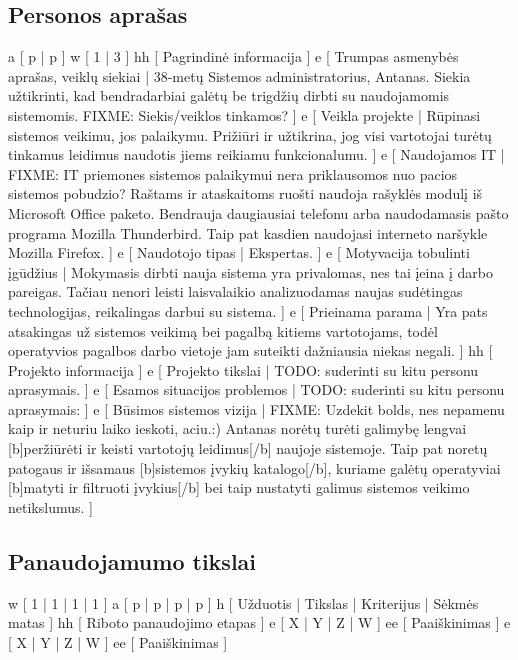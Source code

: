 \subsection{Personos aprašas}
\xtableu
{
  a [ p | p ]
  w [ 1 | 3 ]
  hh [ Pagrindinė informacija ]
  e [ Trumpas asmenybės aprašas, veiklų siekiai
  |
    38-metų Sistemos administratorius, Antanas. Siekia užtikrinti, kad bendradarbiai
    galėtų be trigdžių dirbti su naudojamomis sistemomis.
    FIXME: Siekis/veiklos tinkamos?
  ]
  e [ Veikla projekte
  |
    Rūpinasi sistemos veikimu, jos palaikymu. Prižiūri ir užtikrina, jog visi vartotojai turėtų tinkamus leidimus
    naudotis jiems reikiamu funkcionalumu.
  ]
  e [ Naudojamos IT
  |
    FIXME: IT priemones sistemos palaikymui nera priklausomos nuo pacios sistemos pobudzio?
    Raštams ir ataskaitoms ruošti naudoja rašyklės modulį iš Microsoft Office paketo.
    Bendrauja daugiausiai telefonu arba naudodamasis pašto
    programa Mozilla Thunderbird. Taip pat kasdien naudojasi interneto naršykle Mozilla Firefox.
  ]
  e [ Naudotojo tipas
  |
    Ekspertas.
  ]
  e [ Motyvacija tobulinti įgūdžius
  |
    Mokymasis dirbti nauja sistema yra privalomas, nes tai įeina į darbo pareigas. Tačiau nenori
    leisti laisvalaikio analizuodamas naujas sudėtingas technologijas, reikalingas darbui su sistema.
  ]
  e [ Prieinama parama
  |
    Yra pats atsakingas už sistemos veikimą bei pagalbą kitiems vartotojams, todėl operatyvios pagalbos
    darbo vietoje jam suteikti dažniausia niekas negali.
  ]
  hh [ Projekto informacija ]
  e [ Projekto tikslai
  |
    TODO: suderinti su kitu personu aprasymais.
  ]
  e [ Esamos situacijos problemos
  |
    TODO: suderinti su kitu personu aprasymais:
  ]
  e [ Būsimos sistemos vizija
  |
    FIXME: Uzdekit bolds, nes nepamenu kaip ir neturiu laiko ieskoti, aciu.:)
    Antanas norėtų turėti galimybę lengvai [b]peržiūrėti ir keisti vartotojų leidimus[/b] naujoje sistemoje.
    Taip pat noretų patogaus ir išsamaus [b]sistemos įvykių katalogo[/b], kuriame galėtų operatyviai [b]matyti ir filtruoti
    įvykius[/b] bei taip nustatyti galimus sistemos veikimo netikslumus.
  ]
}

\subsection{Panaudojamumo tikslai}
\xtable
{
  w [ 1 | 1 | 1 | 1 ]
  a [ p | p | p | p ]
  h [ Užduotis | Tikslas | Kriterijus | Sėkmės matas ]
  hh [ Riboto panaudojimo etapas ]
  e [ X | Y | Z | W ]
  ee [ Paaiškinimas ]
  e [ X | Y | Z | W ]
  ee [ Paaiškinimas ]
}